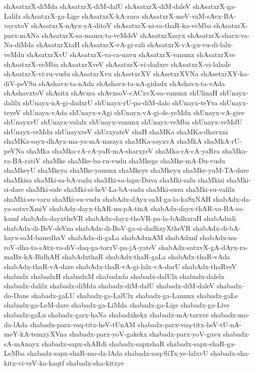 {shAsatxrX-diMda
shAsatxrX-diM-dalU
shAsatxrX-diM-daleV
shAsatxrX-ga-Lalilx
shAsatxrX-ga-Lige
shAsatxrX-kA-rara
shAsatxrX-meV-vaM-sAvx-BA-vayxtoV
shAsatxrX-nAyx-yA-ditoV
shAsatxrX-ni-ra-thaR-ka-veMba
shAsatxrX-parx-mANa
shAsatxrX-sa-mamx-ta-veMdeV
shAsatxrXsayx
shAsatxrX-sharx-va-Na-diMda
shAsatxrXtaH
shAsatxrX-vA-gi-rali
shAsatxrX-vA-gu-vu-di-lalx-veMdu
shAsatxrXvU
shAsatxrX-va-ca-navu
shAsatxrX-vanunx
shAsatxrXve
shAsatxrX-veMba
shAsatxrXveV
shAsatxrX-vi-dadxre
shAsatxrX-vi-lalxde
shAsatxrX-vi-ru-vudu
shAsatxrXvu
shAsetxrXV
shAsetxrXVNa
shAsetxrXY-ka-diV-peVSu
shAshavx-ta-nAda
shAshavx-ta-nA-gidadx
shAshavx-ta-vAda
shAshavxtoV
shAsitx
shAvxsa
shAvxsoV-cACxvX-sa-vanunx
shUlinaH
shUnayx-dalilx
shUnayx-nA-gi-dadxrU
shUnayx-rU-pa-diM-dalo
shUnayx-teYva
shUnayx-teyeV
shUnayx-vAda
shUnayx-vAgi
shUnayx-vA-gi-de-yeMdu
shUnayx-vA-give
shUnayxvU
shUnayx-valalx
shUnayx-vanunx
shUnayx-veMba
shUnayx-veMdU
shUnayx-veMdu
shUnayxveV
shUrxyateV
shaH
shaMKa
shaMKa-dhavxni
shaMKa-sayx-dhAyx-ma-ya-mA-nasayx
shaMKa-sayxvA
shaMkA
shaMkA-rU-peVNa
shaMka
shaMka-rA-cA-yaR-mA-sharxyeV
shaMka-rA-cA-yaRra
shaMka-ra-BA-ratiV
shaMke
shaMke-ba-ru-vudu
shaMkege
shaMke-mA-Du-vudu
shaMkeyU
shaMkeya
shaMke-yanunx
shaMkeye
shaMkeyu
shaMke-yuM-TA-dare
shaMkisa
shaMki-sa-bA-radu
shaMki-sa-lapx-Duva
shaMki-salu
shaMkisi
shaMki-si-dare
shaMki-side
shaMki-si-heV-La-bA-radu
shaMki-suva
shaMki-su-valilx
shaMki-su-varu
shaMki-su-vudu
shabAdx-dAyx-saM-ga-la-kaSxNAH
shabAdx-da-ya-satxvXmiV
shabAdx-dayx-thAR-nu-pA-tinA
shabAdx-dayx-thAR-va-BA-sa-kamf
shabAdx-dayxtheVR
shabAdx-dayx-thoVR-pa-la-bAdhxraH
shabAdxdi
shabAdx-di-BeV-deVna
shabAdx-di-BoV-ga-si-dadhxyXtheVR
shabAdx-di-bA-hayx-saM-banedhxV
shabAdx-di-gaLa
shabAdxnAM
shabAdxnf
shabAdx-nu-roV-dha-ta-sAtx-va-diV-daq-ga-torxV-pa-jA-yateV
shabAdx-satxvX-gA-dAyx-ra-maBx-kA-BidhAH
shabAdxthaR
shabAdx-thaR-gaLa
shabAdx-thaR-vAda
shabAdx-thaR-vA-dare
shabAdx-thaR-vA-gi-lalx-vA-darU
shabAdx-thaRveV
shabadx
shabadxH
shabadxM
shabadxda
shabadx-dalUlx
shabadx-dalelx
shabadx-dalilx
shabadx-diMda
shabadx-diM-dalU
shabadx-diM-daleV
shabadx-do-Dane
shabadx-gaLU
shabadx-ga-LalUlx
shabadx-ga-Lanunx
shabadx-gaLe
shabadx-ga-LeM-dare
shabadx-ga-LiMda
shabadx-ga-Lige
shabadx-ga-Live
shabadx-gaLu
shabadx-garx-haNa
shabadxkekx
shabadx-mA-tarxve
shabadx-mo-da-lAda
shabadx-parx-vaq-titx-heV-tUnAM
shabadx-parx-vaq-titx-heV-tU-nA-meY-kA-temxyXVna
shabadx-parx-yoV-gakekx
shabadx-parx-yoV-gavu
shabadx-sA-mAnayx
shabadx-sapx-shARdi
shabadx-sapxshaR
shabadx-sapx-shaR-ga-LeMba
shabadx-sapx-shaR-mo-da-lAda
shabadx-saq-SiTx-ye-lalxvU
shabadx-sha-kitx-vi-veV-ka-kaqtf
shabadx-sha-kitxye
}
